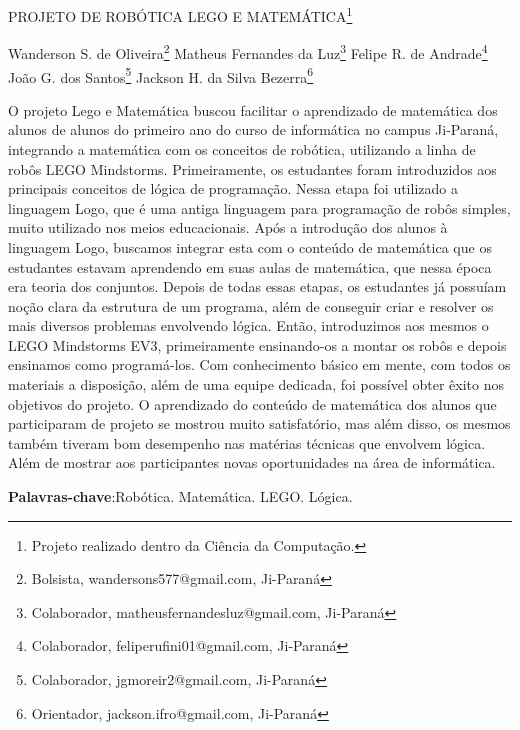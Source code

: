 \documentclass[article,12pt,onesidea,4paper,english,brazil]{abntex2}
\begin{document}
	
	
	\frenchspacing 
	
	\begin{center}
		\LARGE PROJETO DE ROBÓTICA LEGO E MATEMÁTICA\footnote{Projeto realizado dentro da Ciência da Computação.}
		
		\normalsize
		Wanderson S. de Oliveira\footnote{Bolsista, wandersons577@gmail.com, Ji-Paraná} 
		Matheus Fernandes da Luz\footnote{Colaborador, matheusfernandesluz@gmail.com, Ji-Paraná} 
		Felipe R. de Andrade\footnote{Colaborador, feliperufini01@gmail.com, Ji-Paraná} \\
		João G. dos Santos\footnote{Colaborador, jgmoreir2@gmail.com, Ji-Paraná} 
		Jackson H. da Silva Bezerra\footnote{Orientador, jackson.ifro@gmail.com, Ji-Paraná}
	\end{center}
	
	\noindent O projeto Lego e Matemática buscou facilitar o aprendizado de matemática dos
	alunos de alunos do primeiro ano do curso de informática no campus Ji-Paraná,
	integrando a matemática com os conceitos de robótica, utilizando a linha de robôs
	LEGO Mindstorms. Primeiramente, os estudantes foram introduzidos aos principais
	conceitos de lógica de programação. Nessa etapa foi utilizado a linguagem Logo,
	que é uma antiga linguagem para programação de robôs simples, muito utilizado nos
	meios educacionais. Após a introdução dos alunos à linguagem Logo, buscamos
	integrar esta com o conteúdo de matemática que os estudantes estavam
	aprendendo em suas aulas de matemática, que nessa época era teoria dos
	conjuntos. Depois de todas essas etapas, os estudantes já possuíam noção clara da
	estrutura de um programa, além de conseguir criar e resolver os mais diversos
	problemas envolvendo lógica. Então, introduzimos aos mesmos o LEGO Mindstorms
	EV3, primeiramente ensinando-os a montar os robôs e depois ensinamos como
	programá-los. Com conhecimento básico em mente, com todos os materiais a
	disposição, além de uma equipe dedicada, foi possível obter êxito nos objetivos do
	projeto. O aprendizado do conteúdo de matemática dos alunos que participaram de
	projeto se mostrou muito satisfatório, mas além disso, os mesmos também tiveram
	bom desempenho nas matérias técnicas que envolvem lógica. Além de mostrar aos
	participantes novas oportunidades na área de informática.
	
	\vspace{\onelineskip}
	
	\noindent
	\textbf{Palavras-chave}:Robótica. Matemática. LEGO. Lógica.
	
\end{document}
